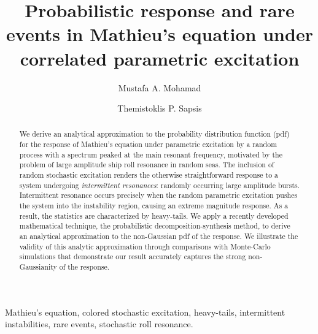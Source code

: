 \documentclass[3p]{elsarticle}
\begin{document}
\title{Probabilistic response and rare events in Mathieu's equation under correlated parametric excitation}


\author{Mustafa A. Mohamad}

\author{Themistoklis P. Sapsis}

\address{Department of Mechanical Engineering, Massachusetts Institute of Technology,\\ 77 Massachusetts Ave, Cambridge, MA 02139, USA}

\begin{abstract} 

We derive an analytical approximation to the probability distribution function (pdf) for the response of   Mathieu's equation under parametric excitation by a random process  with a spectrum peaked at the main resonant frequency, motivated by the problem of large amplitude ship roll resonance in random seas.  The inclusion of random stochastic excitation    renders the otherwise straightforward response to a system undergoing \emph{intermittent resonances}:  randomly occurring large amplitude bursts. Intermittent resonance occurs precisely when the random parametric excitation pushes the system into the instability region, causing an extreme magnitude   response. As a result, the statistics are characterized by heavy-tails.  We apply a recently developed mathematical technique, the  probabilistic decomposition-synthesis method,   to derive an analytical approximation to the  non-Gaussian pdf of the response.  We illustrate the validity of this analytic approximation  through comparisons with Monte-Carlo simulations that  demonstrate  our result accurately captures the strong non-Gaussianity of the response. 
\end{abstract}

\begin{keyword}
Mathieu's equation, colored stochastic excitation, heavy-tails, intermittent instabilities, rare events, stochastic roll resonance. 

\end{keyword}
\maketitle
\end{document}

